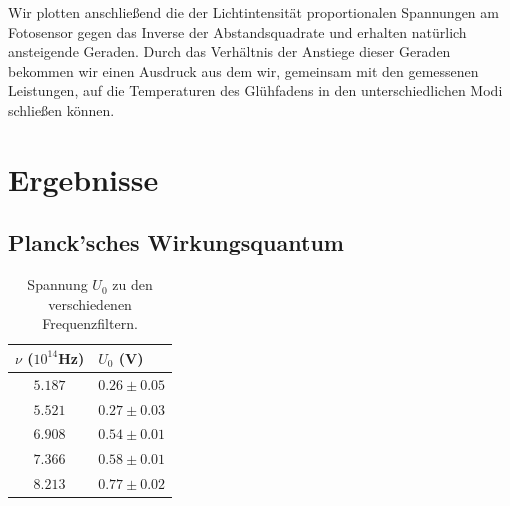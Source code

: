 \documentclass[12pt,a4paper,twopage]{article}
\begin{document}
 Wir plotten anschließend die der Lichtintensität proportionalen Spannungen am Fotosensor gegen das Inverse der Abstandsquadrate und erhalten natürlich ansteigende Geraden. Durch das Verhältnis der Anstiege dieser Geraden bekommen wir einen Ausdruck aus dem wir, gemeinsam mit den gemessenen Leistungen, auf die Temperaturen des Glühfadens in den unterschiedlichen Modi schließen können.

\section{Ergebnisse}
\subsection{Planck'sches Wirkungsquantum}

\begin{table}[H]
\begin{center}
\begin{tabular}{|c|l|}
\hline
$\nu$ ($10^{14}$Hz) & $U_0$ (V)\\
\hline
$5.187$ & $0.26 \pm 0.05$\\
$5.521$ & $0.27 \pm 0.03$\\
$6.908$ & $0.54 \pm 0.01$\\
$7.366$ & $0.58 \pm 0.01$\\
$8.213$ & $0.77 \pm 0.02$\\
\hline
\end{tabular}
\caption{Spannung $U_0$ zu den verschiedenen Frequenzfiltern.}
\end{center}
\end{table}
\end{document}
